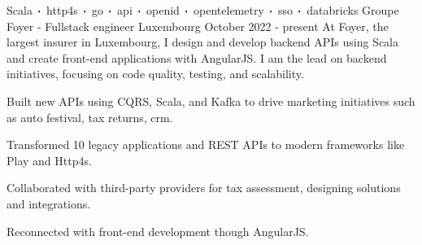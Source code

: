 
\newcommand*{\logo}[2]{\raisebox{-0.2em}{\texttt{[image: \#2]}}\hspace{0.25em}#1}
\newcommand*{\logoonly}[1]{\raisebox{-0.2em}{\texttt{[image: \#1]}}}

\begin{cventries}
    \cventry
    {Scala$\sqbig$http4s$\sqbig$go$\sqbig$api$\sqbig$openid$\sqbig$opentelemetry$\sqbig$sso$\sqbig$databricks}
    {\logo{Groupe Foyer}{../../../images/foyer.png} - Fullstack engineer}
    {Luxembourg}
    {October 2022 - present}
    {At Foyer, the largest insurer in Luxembourg, I design and develop backend APIs using Scala and create front-end applications with AngularJS. I am the lead on backend initiatives, focusing on code quality, testing, and scalability.}
    {
        \begin{cvitems}
            \item{Built new APIs using CQRS, Scala, and Kafka to drive marketing initiatives such as auto festival, tax returns, crm.}
            \item{Transformed 10 legacy applications and REST APIs to modern frameworks like Play and Http4s.}
            \item{Collaborated with third-party providers for tax assessment, designing solutions and integrations.}
            \item{Reconnected with front-end development though AngularJS.}
        \end{cvitems}
    }




\end{cventries}
